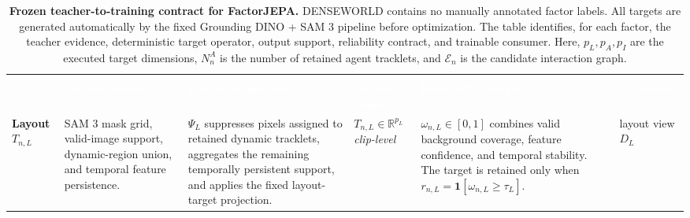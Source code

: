 \begin{table}[ht!]
\centering
\caption{
\textbf{Frozen teacher-to-training contract for FactorJEPA.}
DENSEWORLD contains no manually annotated factor labels. All targets
are generated automatically by the fixed Grounding DINO + SAM 3 pipeline before
optimization. The table identifies, for each factor, the teacher
evidence, deterministic target operator, output support, reliability
contract, and trainable consumer. Here, \(p_L,p_A,p_I\) are the
executed target dimensions, \(N_n^A\) is the number of retained agent
tracklets, and \(\mathcal E_n\) is the candidate interaction graph.
}
\label{tab:factor_targets}

\scriptsize
\setlength{\tabcolsep}{3pt}
\renewcommand{\arraystretch}{1.22}

\begin{tabular}{
    >{\raggedright\arraybackslash}p{}
    >{\raggedright\arraybackslash}p{}
    >{\raggedright\arraybackslash}p{}
    >{\centering\arraybackslash}p{}
    >{\raggedright\arraybackslash}p{}
    >{\raggedright\arraybackslash}p{}
}
\toprule

\rowcolor{FTHeader}
\multicolumn{1}{c}{
\textcolor{white}{\textbf{Factor}}
}
&
\multicolumn{4}{c}{
\textcolor{white}{
\textbf{Frozen teacher-side target contract}
}
}
&
\multicolumn{1}{c}{
\textcolor{white}{
\textbf{Training side}
}
}
\\

\rowcolor{FTSubheader}
\textcolor{white}{\textbf{Target}}
&
\textcolor{white}{\textbf{Teacher evidence}}
&
\textcolor{white}{\textbf{Executed operator}}
&
\textcolor{white}{\textbf{Output support}}
&
\textcolor{white}{\textbf{Reliability contract}}
&
\textcolor{white}{\textbf{Consumer}}
\\
\midrule

\rowcolor{LayoutRow}
\cellcolor{LayoutCell}
\textbf{Layout}
\newline
\(T_{n,L}\)
&
SAM 3 mask grid, valid-image support, dynamic-region union,
and temporal feature persistence.
&
\(\Psi_L\) suppresses pixels assigned to retained dynamic tracklets,
aggregates the remaining temporally persistent support, and applies the
fixed layout-target projection.
&
\(
T_{n,L}
\in
\mathbb R^{p_L}
\)
\newline
\emph{clip-level}
&
\(\omega_{n,L}\in[0,1]\) combines valid background coverage, feature
confidence, and temporal stability. The target is retained only when
\(r_{n,L}=\mathbf 1[\omega_{n,L}\ge\tau_L]\).
&
layout view
\newline
\(D_L\)
\\


\end{tabular}
\end{table}
